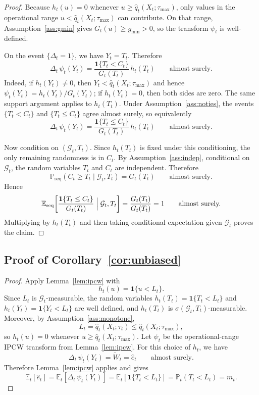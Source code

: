 \documentclass[11pt]{article}
\newcommand{\E}{\mathbb{E}}
\newcommand{\Prob}{\mathbb{P}}
\newcommand{\1}{\mathbf{1}}
\newcommand{\seq}{\mathrm{seq}}
\newcommand{\cG}{\mathcal{G}}
\begin{document}
\begin{proof}
Because $h_t(u)=0$ whenever $u\ge \hat q_t(X_t;\tau_{\max})$, only values in the operational range $u<\hat q_t(X_t;\tau_{\max})$ can contribute. On that range, Assumption~\ref{ass:gmin} gives $G_t(u)\ge g_{\min}>0$, so the transform $\psi_t$ is well-defined.

On the event \(\{\Delta_t=1\}\), we have \(Y_t=T_t\). Therefore
\[
\Delta_t\,\psi_t(Y_t)
=
\frac{\1\{T_t<C_t\}}{G_t(T_t)}\,h_t(T_t)
\qquad\text{almost surely.}
\]
Indeed, if $h_t(Y_t)\neq 0$, then $Y_t<\hat q_t(X_t;\tau_{\max})$ and hence $\psi_t(Y_t)=h_t(Y_t)/G_t(Y_t)$; if $h_t(Y_t)=0$, then both sides are zero. The same support argument applies to $h_t(T_t)$. Under Assumption~\ref{ass:noties}, the events \(\{T_t<C_t\}\) and \(\{T_t\le C_t\}\) agree almost surely, so equivalently
\[
\Delta_t\,\psi_t(Y_t)
=
\frac{\1\{T_t\le C_t\}}{G_t(T_t)}\,h_t(T_t)
\qquad\text{almost surely.}
\]

Now condition on \((\cG_t,T_t)\). Since \(h_t(T_t)\) is fixed under this conditioning, the only remaining randomness is in \(C_t\). By Assumption~\ref{ass:indep}, conditional on \(\cG_t\), the random variables \(T_t\) and \(C_t\) are independent. Therefore
\[
\Prob_{\seq}(C_t\ge T_t\mid \cG_t,T_t)=G_t(T_t)
\qquad\text{almost surely.}
\]
Hence
\[
\E_{\seq}\!\left[
\frac{\1\{T_t\le C_t\}}{G_t(T_t)}
\Bigm| \cG_t,T_t
\right]
=
\frac{G_t(T_t)}{G_t(T_t)}
=
1
\qquad\text{almost surely.}
\]
Multiplying by \(h_t(T_t)\) and then taking conditional expectation given \(\cG_t\) proves the claim.
\end{proof}

\subsection{Proof of Corollary~\ref{cor:unbiased}}
\label{app:proof-surrogate}

\begin{proof}
Apply Lemma~\ref{lem:ipcw} with
\[
h_t(u)=\1\{u< L_t\}.
\]
Since \(L_t\) is \(\cG_t\)-measurable, the random variables \(h_t(T_t)=\1\{T_t< L_t\}\) and \(h_t(Y_t)=\1\{Y_t< L_t\}\) are well defined, and \(h_t(T_t)\) is \(\sigma(\cG_t,T_t)\)-measurable. Moreover, by Assumption~\ref{ass:monotone},
\[
L_t=\hat q_t(X_t;\tau_t)\le \hat q_t(X_t;\tau_{\max}),
\]
so \(h_t(u)=0\) whenever \(u\ge \hat q_t(X_t;\tau_{\max})\). Let \(\psi_t\) be the operational-range IPCW transform from Lemma~\ref{lem:ipcw}. For this choice of \(h_t\), we have
\[
\Delta_t\,\psi_t(Y_t)=\widetilde W_t=\hat e_t
\qquad\text{almost surely.}
\]
Therefore Lemma~\ref{lem:ipcw} applies and gives
\[
\E_t[\hat e_t]
=
\E_t[\Delta_t\,\psi_t(Y_t)]
=
\E_t[\1\{T_t< L_t\}]
=
\Prob_t(T_t< L_t)
=
m_t.
\]
\end{proof}
\end{document}
